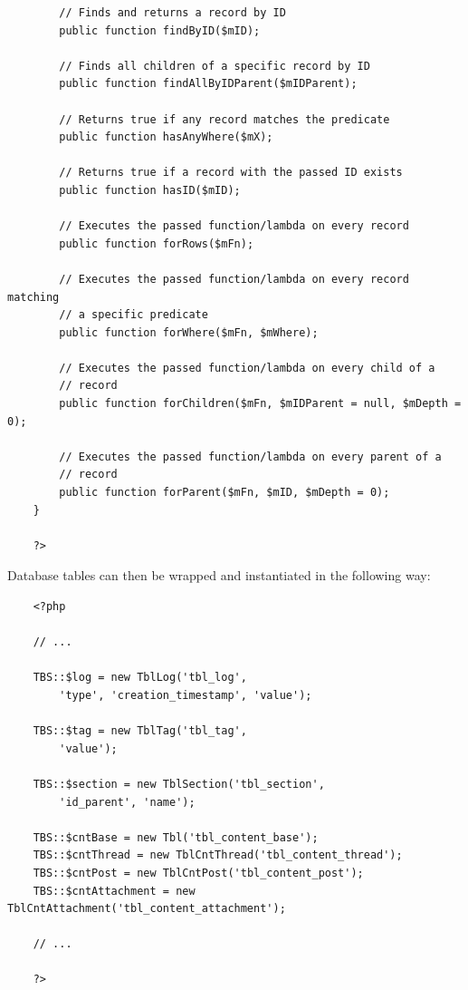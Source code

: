 \documentclass[12pt]{report}
\begin{document}
\begin{verbatim}
        // Finds and returns a record by ID
        public function findByID($mID);

        // Finds all children of a specific record by ID
        public function findAllByIDParent($mIDParent);

        // Returns true if any record matches the predicate
        public function hasAnyWhere($mX);

        // Returns true if a record with the passed ID exists
        public function hasID($mID);

        // Executes the passed function/lambda on every record
        public function forRows($mFn);

        // Executes the passed function/lambda on every record matching
        // a specific predicate
        public function forWhere($mFn, $mWhere);

        // Executes the passed function/lambda on every child of a
        // record
        public function forChildren($mFn, $mIDParent = null, $mDepth = 0);

        // Executes the passed function/lambda on every parent of a
        // record
        public function forParent($mFn, $mID, $mDepth = 0);
    }

    ?>
                    \end{verbatim}                

                    Database tables can then be wrapped and instantiated in the following way:

                    \begin{verbatim}
    <?php

    // ...

    TBS::$log = new TblLog('tbl_log',
        'type', 'creation_timestamp', 'value');

    TBS::$tag = new TblTag('tbl_tag',
        'value');

    TBS::$section = new TblSection('tbl_section',
        'id_parent', 'name');

    TBS::$cntBase = new Tbl('tbl_content_base');
    TBS::$cntThread = new TblCntThread('tbl_content_thread');
    TBS::$cntPost = new TblCntPost('tbl_content_post');
    TBS::$cntAttachment = new TblCntAttachment('tbl_content_attachment');

    // ...

    ?>
                    \end{verbatim}              
                
\end{document}
